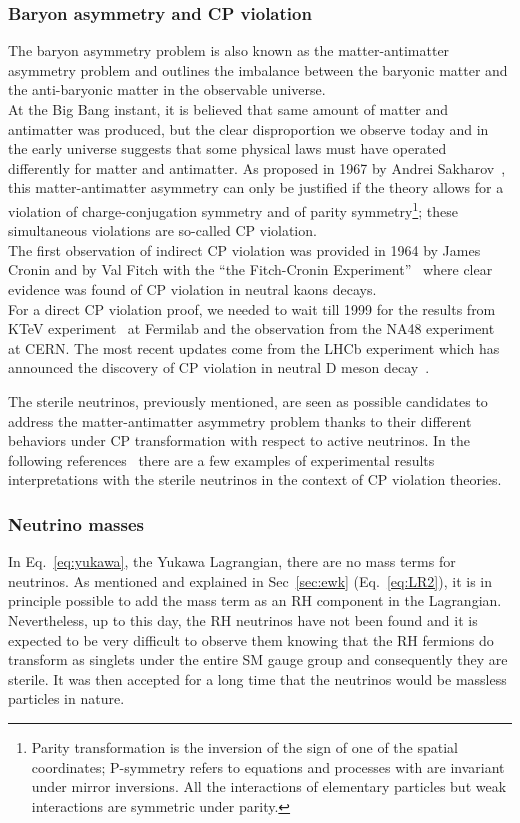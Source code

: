 \subsubsection{Baryon asymmetry and CP violation}
The baryon asymmetry problem is also known as the matter-antimatter asymmetry problem and outlines the imbalance between the baryonic matter and the anti-baryonic matter in the observable universe.\\
 At the Big Bang instant, it is believed that same amount of matter and antimatter was produced, but the clear disproportion we observe today and in the early universe suggests that some physical laws must have operated differently for matter and antimatter. As proposed in 1967 by Andrei Sakharov~\cite{Sakharov:1967dj}, this matter-antimatter asymmetry can only be justified if the theory allows for a violation of charge-conjugation symmetry and of parity symmetry\footnote{Parity transformation is the inversion of the sign of one of the spatial coordinates; P-symmetry refers to equations and processes with are invariant under mirror inversions. All the interactions of elementary particles but weak interactions are symmetric under parity.}; these simultaneous violations are so-called CP violation. \\
The first observation of indirect CP violation was provided in 1964 by James Cronin and by Val Fitch with the ``the Fitch-Cronin Experiment''~\cite{PhysRevLett.13.138} where clear evidence was found of CP violation in neutral kaons decays.\\
For a direct CP violation proof, we needed to wait till 1999 for the results from KTeV experiment~\cite{Alavi_Harati_1999} at Fermilab and the observation from the NA48 experiment~\cite{Fanti_1999} at CERN. The most recent updates come from the LHCb experiment which has announced the discovery of CP violation in neutral D meson decay~\cite{PhysRevLett.122.211803}.

The sterile neutrinos, previously mentioned, are seen as possible candidates to address the matter-antimatter asymmetry problem thanks to their different behaviors under CP transformation with respect to active neutrinos. In the following references~\cite{Gandhi_2015,Klop_2015,Palazzo_2020}  there are a few examples of experimental results interpretations with the sterile neutrinos in the context of CP violation theories.

\subsubsection{Neutrino masses}
In Eq.~\ref{eq:yukawa}, the Yukawa Lagrangian, there are no mass terms for neutrinos. As mentioned and explained in Sec~\ref{sec:ewk} (Eq.~\ref{eq:LR2}), it is in principle possible to add the mass term as an RH component in the Lagrangian. Nevertheless, up to this day, the RH neutrinos have not been found and it is expected to be very difficult to observe them knowing that the RH fermions do transform as singlets under the entire SM gauge group and consequently they are sterile. It was then accepted for a long time that the neutrinos would be massless particles in nature.

